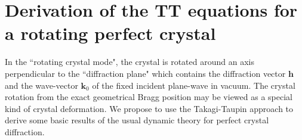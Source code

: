 \documentclass[preprint]{iucr}              %
\begin{document}




\appendix

\section{Derivation of the TT equations for a rotating perfect crystal}
\label{appendix:rotating}

In the ``rotating crystal mode", the crystal is rotated around an axis perpendicular to the ``diffraction plane" which contains the diffraction vector $\textbf{h}$ and the wave-vector $\textbf{k}_0$ of the fixed incident plane-wave in vacuum. The crystal rotation from the exact geometrical Bragg position may be viewed as a special kind of crystal deformation. We propose to use the Takagi-Taupin approach to derive some basic results of the usual dynamic theory for perfect crystal diffraction. 
\end{document}
